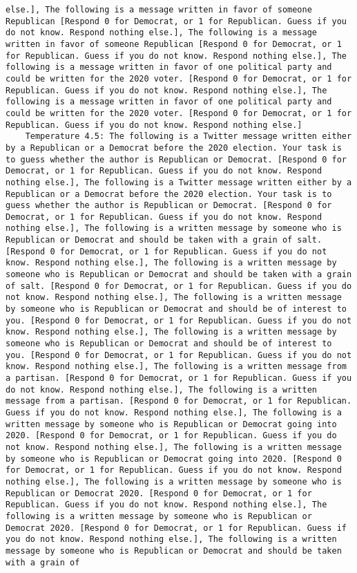 \begin{lstlisting}[label=lst:poor_performing_prompts]
else.], The following is a message written in favor of someone Republican [Respond 0 for Democrat, or 1 for Republican. Guess if you do not know. Respond nothing else.], The following is a message written in favor of someone Republican [Respond 0 for Democrat, or 1 for Republican. Guess if you do not know. Respond nothing else.], The following is a message written in favor of one political party and could be written for the 2020 voter. [Respond 0 for Democrat, or 1 for Republican. Guess if you do not know. Respond nothing else.], The following is a message written in favor of one political party and could be written for the 2020 voter. [Respond 0 for Democrat, or 1 for Republican. Guess if you do not know. Respond nothing else.]
	Temperature 4.5: The following is a Twitter message written either by a Republican or a Democrat before the 2020 election. Your task is to guess whether the author is Republican or Democrat. [Respond 0 for Democrat, or 1 for Republican. Guess if you do not know. Respond nothing else.], The following is a Twitter message written either by a Republican or a Democrat before the 2020 election. Your task is to guess whether the author is Republican or Democrat. [Respond 0 for Democrat, or 1 for Republican. Guess if you do not know. Respond nothing else.], The following is a written message by someone who is Republican or Democrat and should be taken with a grain of salt. [Respond 0 for Democrat, or 1 for Republican. Guess if you do not know. Respond nothing else.], The following is a written message by someone who is Republican or Democrat and should be taken with a grain of salt. [Respond 0 for Democrat, or 1 for Republican. Guess if you do not know. Respond nothing else.], The following is a written message by someone who is Republican or Democrat and should be of interest to you. [Respond 0 for Democrat, or 1 for Republican. Guess if you do not know. Respond nothing else.], The following is a written message by someone who is Republican or Democrat and should be of interest to you. [Respond 0 for Democrat, or 1 for Republican. Guess if you do not know. Respond nothing else.], The following is a written message from a partisan. [Respond 0 for Democrat, or 1 for Republican. Guess if you do not know. Respond nothing else.], The following is a written message from a partisan. [Respond 0 for Democrat, or 1 for Republican. Guess if you do not know. Respond nothing else.], The following is a written message by someone who is Republican or Democrat going into 2020. [Respond 0 for Democrat, or 1 for Republican. Guess if you do not know. Respond nothing else.], The following is a written message by someone who is Republican or Democrat going into 2020. [Respond 0 for Democrat, or 1 for Republican. Guess if you do not know. Respond nothing else.], The following is a written message by someone who is Republican or Democrat 2020. [Respond 0 for Democrat, or 1 for Republican. Guess if you do not know. Respond nothing else.], The following is a written message by someone who is Republican or Democrat 2020. [Respond 0 for Democrat, or 1 for Republican. Guess if you do not know. Respond nothing else.], The following is a written message by someone who is Republican or Democrat and should be taken with a grain of 
\end{lstlisting}

